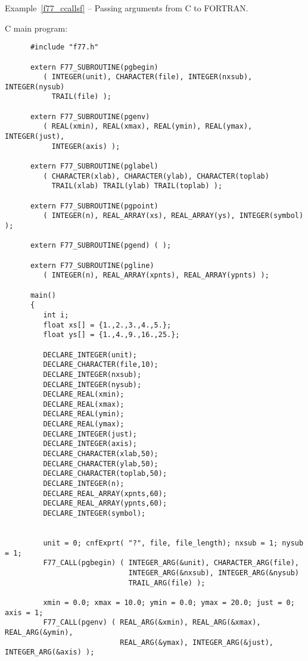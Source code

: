 \documentclass[twoside,11pt]{article}
\newcommand{\latex}[1]{#1}
\renewcommand{\_}{\texttt{\symbol{95}}}
\newcounter{examples}
\begin{document}
\label{f77_ccallsf}
\begin{center}
Example\latex{~\ref{f77_ccallsf}}
-- Passing arguments from C to FORTRAN\@.
\end{center}
\nopagebreak[4]
C main program:
{\small \begin{verbatim}
      #include "f77.h"

      extern F77_SUBROUTINE(pgbegin)
         ( INTEGER(unit), CHARACTER(file), INTEGER(nxsub), INTEGER(nysub)
           TRAIL(file) );
     
      extern F77_SUBROUTINE(pgenv)
         ( REAL(xmin), REAL(xmax), REAL(ymin), REAL(ymax), INTEGER(just),
           INTEGER(axis) );

      extern F77_SUBROUTINE(pglabel)
         ( CHARACTER(xlab), CHARACTER(ylab), CHARACTER(toplab)
           TRAIL(xlab) TRAIL(ylab) TRAIL(toplab) );

      extern F77_SUBROUTINE(pgpoint)
         ( INTEGER(n), REAL_ARRAY(xs), REAL_ARRAY(ys), INTEGER(symbol) );

      extern F77_SUBROUTINE(pgend) ( );

      extern F77_SUBROUTINE(pgline)
         ( INTEGER(n), REAL_ARRAY(xpnts), REAL_ARRAY(ypnts) );

      main()
      {
         int i;
         float xs[] = {1.,2.,3.,4.,5.};
         float ys[] = {1.,4.,9.,16.,25.};

         DECLARE_INTEGER(unit);
         DECLARE_CHARACTER(file,10);
         DECLARE_INTEGER(nxsub);
         DECLARE_INTEGER(nysub);
         DECLARE_REAL(xmin);
         DECLARE_REAL(xmax);
         DECLARE_REAL(ymin);
         DECLARE_REAL(ymax);
         DECLARE_INTEGER(just);
         DECLARE_INTEGER(axis);
         DECLARE_CHARACTER(xlab,50);
         DECLARE_CHARACTER(ylab,50);
         DECLARE_CHARACTER(toplab,50);
         DECLARE_INTEGER(n);
         DECLARE_REAL_ARRAY(xpnts,60);
         DECLARE_REAL_ARRAY(ypnts,60);
         DECLARE_INTEGER(symbol);


         unit = 0; cnfExprt( "?", file, file_length); nxsub = 1; nysub = 1;
         F77_CALL(pgbegin) ( INTEGER_ARG(&unit), CHARACTER_ARG(file), 
                             INTEGER_ARG(&nxsub), INTEGER_ARG(&nysub)
                             TRAIL_ARG(file) );

         xmin = 0.0; xmax = 10.0; ymin = 0.0; ymax = 20.0; just = 0; axis = 1;
         F77_CALL(pgenv) ( REAL_ARG(&xmin), REAL_ARG(&xmax), REAL_ARG(&ymin),
                           REAL_ARG(&ymax), INTEGER_ARG(&just), INTEGER_ARG(&axis) );


\end{verbatim}}
\end{document}
